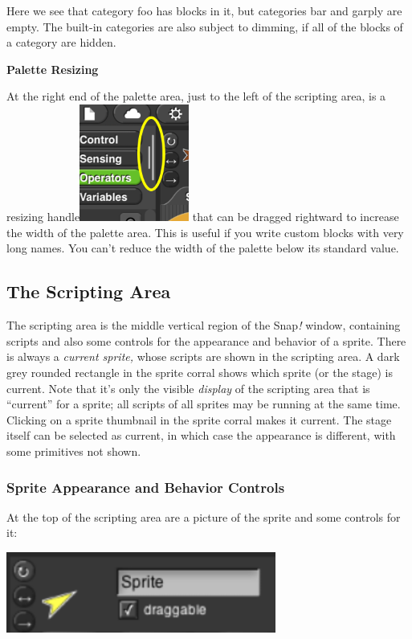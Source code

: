 Here we see that category foo has blocks in it, but categories bar and
garply are empty. The built-in categories are also subject to dimming,
if all of the blocks of a category are hidden.

\textbf{\hfill\break
Palette Resizing}

At the right end of the palette area, just to the left of the scripting
area, is a resizing
handle\includegraphics[width=1.41667in,height=1.51389in]{media/image1063.png}
that can be dragged rightward to increase the width of the palette area.
This is useful if you write custom blocks with very long names. You
can't reduce the width of the palette below its standard value.

\subsection{The Scripting Area}\label{the-scripting-area}

The scripting area is the middle vertical region of the Snap\emph{!}
window, containing scripts and also some controls for the appearance and
behavior of a sprite. There is always a \emph{current sprite,} whose
scripts are shown in the scripting area. A dark grey rounded rectangle
in the sprite corral shows which sprite (or the stage) is current. Note
that it's only the visible \emph{display} of the scripting area that is
``current'' for a sprite; all scripts of all sprites may be running at
the same time. Clicking on a sprite thumbnail in the sprite corral makes
it current. The stage itself can be selected as current, in which case
the appearance is different, with some primitives not shown.

\subsubsection{Sprite Appearance and Behavior
Controls}\label{sprite-appearance-and-behavior-controls}

At the top of the scripting area are a picture of the sprite and some
controls for it:

\includegraphics[width=3.48611in,height=1.04167in]{media/image1064.png}

